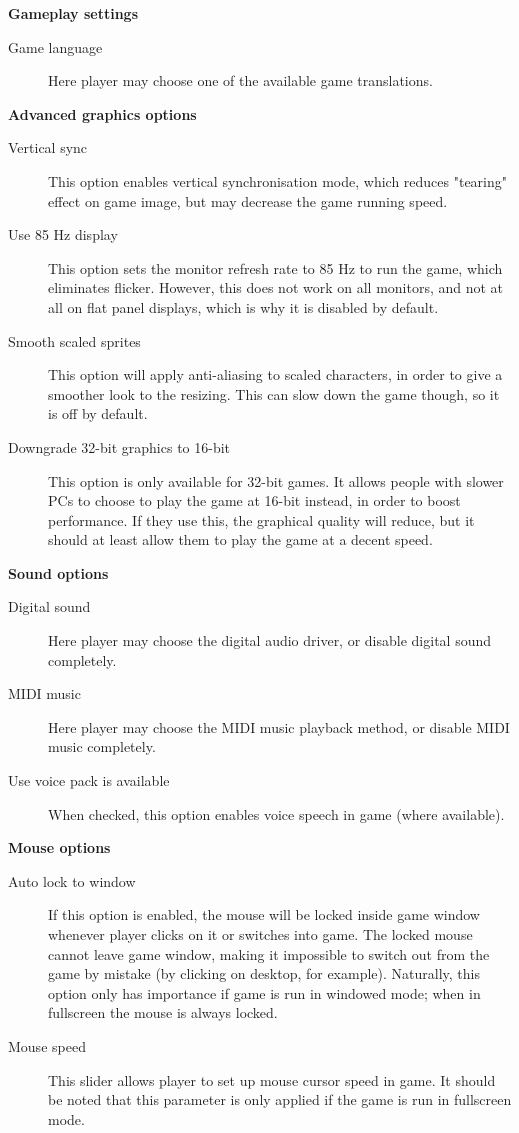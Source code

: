 \bf{Gameplay settings}

\begin{description}
\item [Game language]
  Here player may choose one of the available game translations.
\end{description}

\bf{Advanced graphics options}

\begin{description}
\item [Vertical sync]
  This option enables vertical synchronisation mode, which reduces "tearing" effect on game image, but may decrease the game running speed.
\item [Use 85 Hz display]
  This option sets the monitor refresh rate to 85 Hz to run the game, which eliminates flicker. However, this does not work on all monitors, and not at all on flat
panel displays, which is why it is disabled by default.
\item [Smooth scaled sprites]
  This option will apply anti-aliasing to scaled characters, in order to give
a smoother look to the resizing. This can slow down the game though, so it is off by default.
\item [Downgrade 32-bit graphics to 16-bit]
  This option is only available for 32-bit games. It allows people with slower PCs
to choose to play the game at 16-bit instead, in order to boost performance.
If they use this, the graphical quality will reduce, but it should at least allow them to play
the game at a decent speed.
\end{description}

\bf{Sound options}

\begin{description}
\item [Digital sound]
  Here player may choose the digital audio driver, or disable digital sound completely.
\item [MIDI music]
  Here player may choose the MIDI music playback method, or disable MIDI music completely.
\item [Use voice pack is available]
  When checked, this option enables voice speech in game (where available).
\end{description}

\bf{Mouse options}

\begin{description}
\item [Auto lock to window]
  If this option is enabled, the mouse will be locked inside game window whenever player clicks on it or switches into game.
The locked mouse cannot leave game window, making it impossible to switch out from the game by mistake (by clicking on desktop,
for example). Naturally, this option only has importance if game is run in windowed mode; when in fullscreen the mouse is always
locked.
\item [Mouse speed]
  This slider allows player to set up mouse cursor speed in game. It should be noted that this parameter is only applied if the
game is run in fullscreen mode.
\end{description}

